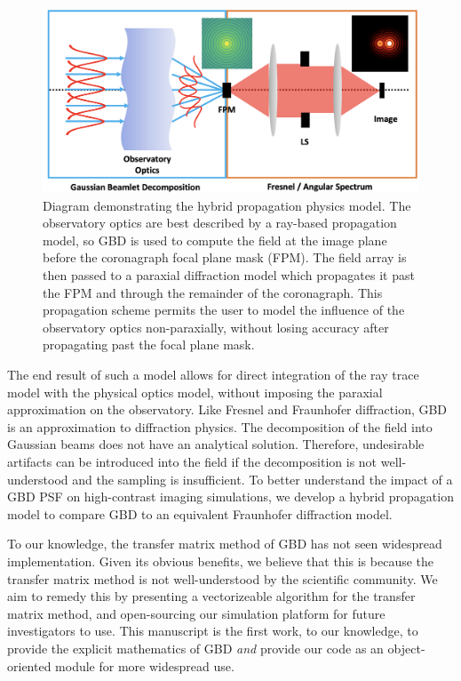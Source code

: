 \begin{figure}[H]
    \centering
    \includegraphics[width=\textwidth]{hybridprop2.png}
    \caption{Diagram demonstrating the hybrid propagation physics model. The observatory optics are best described by a ray-based propagation model, so GBD is used to compute the field at the image plane before the coronagraph focal plane mask (FPM). The field array is then passed to a paraxial diffraction model which propagates it past the FPM and through the remainder of the coronagraph. This propagation scheme permits the user to model the influence of the observatory optics non-paraxially, without losing accuracy after propagating past the focal plane mask.}
    \label{fig:hybridpropdiagram}
\end{figure}

The end result of such a model allows for direct integration of the ray trace model with the physical optics model, without imposing the paraxial approximation on the observatory. Like Fresnel and Fraunhofer diffraction, GBD is an approximation to diffraction physics. The decomposition of the field into Gaussian beams does not have an analytical solution. Therefore, undesirable artifacts can be introduced into the field if the decomposition is not well-understood and the sampling is insufficient\cite{Ashcraft2020}. To better understand the impact of a GBD PSF on high-contrast imaging simulations, we develop a hybrid propagation model to compare GBD to an equivalent Fraunhofer diffraction model.

To our knowledge, the transfer matrix method of GBD has not seen widespread implementation. Given its obvious benefits, we believe that this is because the transfer matrix method is not well-understood by the scientific community. We aim to remedy this by presenting a vectorizeable algorithm for the transfer matrix method, and open-sourcing our simulation platform for future investigators to use. This manuscript is the first work, to our knowledge, to provide the explicit mathematics of GBD \emph{and} provide our code as an object-oriented module for more widespread use. 

